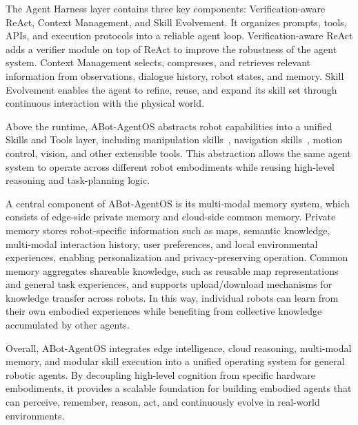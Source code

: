 The Agent Harness layer contains three key components: Verification-aware ReAct, Context Management, and Skill Evolvement. It organizes prompts, tools, APIs, and execution protocols into a reliable agent loop. Verification-aware ReAct adds a verifier module on top of ReAct to improve the robustness of the agent system. Context Management selects, compresses, and retrieves relevant information from observations, dialogue history, robot states, and memory. Skill Evolvement enables the agent to refine, reuse, and expand its skill set through continuous interaction with the physical world.

Above the runtime, ABot-AgentOS abstracts robot capabilities into a unified Skills and Tools layer, including manipulation skills~\cite{yang2026abot}, navigation skills~\cite{chu2026abot,yang2026asyncshieldplugandplayedgeadapter,yang2025cenavflowguidedreinforcementrefinement},
motion control, vision, and other extensible tools. This abstraction allows the same agent system to operate across different robot embodiments while reusing high-level reasoning and task-planning logic.

A central component of ABot-AgentOS is its multi-modal memory system, which consists of edge-side private memory and cloud-side common memory. Private memory stores robot-specific information such as maps, semantic knowledge, multi-modal interaction history, user preferences, and local environmental experiences, enabling personalization and privacy-preserving operation. Common memory aggregates shareable knowledge, such as reusable map representations and general task experiences, and supports upload/download mechanisms for knowledge transfer across robots. In this way, individual robots can learn from their own embodied experiences while benefiting from collective knowledge accumulated by other agents.

Overall, ABot-AgentOS integrates edge intelligence, cloud reasoning, multi-modal memory, and modular skill execution into a unified operating system for general robotic agents. By decoupling high-level cognition from specific hardware embodiments, it provides a scalable foundation for building embodied agents that can perceive, remember, reason, act, and continuously evolve in real-world environments.




